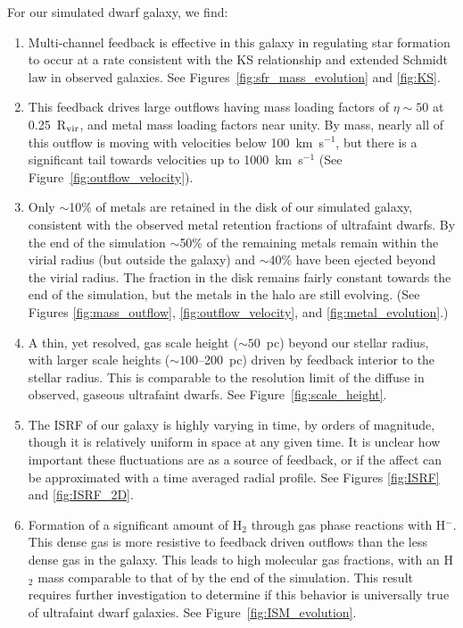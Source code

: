 \documentclass[twocolumn]{aastex61}
\begin{document}
For our simulated dwarf galaxy, we find:
\begin{enumerate}
\item Multi-channel feedback is effective in this galaxy in regulating star formation to occur at a rate consistent with the KS relationship and extended Schmidt law in observed galaxies. See Figures~\ref{fig:sfr_mass_evolution} and \ref{fig:KS}.

\item This feedback drives large outflows having mass loading factors of $\eta \sim 50$ at 0.25~R$_{\rm vir}$, and
metal mass loading factors near unity. By mass, nearly all of this outflow is moving with velocities below 100~km~s$^{-1}$, but there is a significant tail towards velocities up to 1000~km~s$^{-1}$ (See Figure~\ref{fig:outflow_velocity}). 

\item 
Only $\sim$10\% of metals are retained in the disk of our simulated galaxy, consistent with the observed metal retention fractions of ultrafaint dwarfs.  By the end of the simulation $\sim$50\% of the remaining metals remain within the virial radius (but outside the galaxy) and $\sim$40\% 
have been ejected beyond the virial radius. The fraction in the disk remains fairly constant towards the end of the simulation, but the metals in the halo are still evolving. (See Figures \ref{fig:mass_outflow}, \ref{fig:outflow_velocity}, and \ref{fig:metal_evolution}.)

\item A thin, yet resolved, gas scale height ($\sim 50$~pc) beyond our stellar radius, with larger scale heights ($\sim 100$--200~pc) driven by feedback interior to the stellar radius. This is comparable to the resolution limit of the diffuse  in observed, gaseous ultrafaint dwarfs. See Figure~\ref{fig:scale_height}.

\item The ISRF of our galaxy is highly varying in time, by orders of magnitude, though it is relatively uniform in space at any given time. It is unclear how important these fluctuations are as a source of feedback, or if the affect can be approximated with a time averaged radial profile. See Figures \ref{fig:ISRF} and \ref{fig:ISRF_2D}.

\item Formation of a significant amount of H$_2$ through gas phase reactions with H$^-$. This dense gas is more resistive to feedback driven outflows than the less dense gas in the galaxy. This leads to high molecular gas fractions, with an H$_2$ mass comparable to that of  by the end of the simulation. This result requires further investigation to determine if this behavior is universally true of ultrafaint dwarf galaxies. See Figure~\ref{fig:ISM_evolution}.
\end{enumerate}
\end{document}
